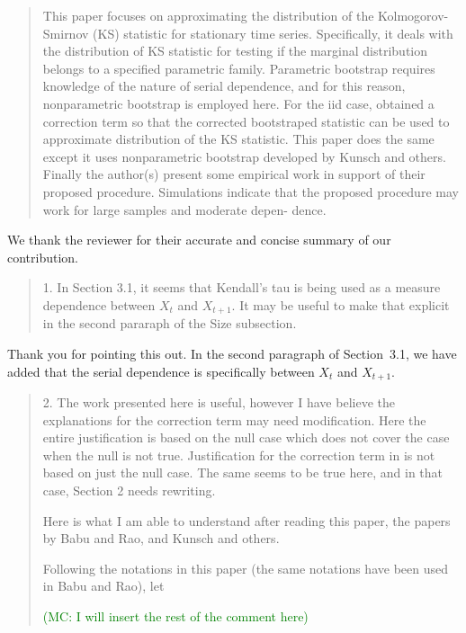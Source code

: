 \documentclass[12pt]{article}
\newcommand{\mc}[1]{\textcolor{green}{(MC: #1)}}
\newenvironment{comment}%
{\begin{quotation}\noindent\small\it\color{darkblue}\ignorespaces%
}{\end{quotation}}
\begin{document}
\begin{comment}
This paper focuses on approximating the distribution of the Kolmogorov-
Smirnov (KS) statistic for stationary time series. Specifically, it deals with the
distribution of KS statistic for testing if the marginal distribution belongs to
a specified parametric family. Parametric bootstrap requires knowledge of the
nature of serial dependence, and for this reason, nonparametric bootstrap is 
employed here. For the iid case, \citet{babu2004goodness} obtained a correction 
term so that the corrected bootstraped statistic can be used to approximate 
distribution of the KS statistic. This paper does the same except it uses 
nonparametric bootstrap developed by Kunsch and others. Finally the author(s) 
present some empirical work in support of their proposed procedure. Simulations 
indicate that the proposed procedure may work for large samples and moderate depen-
dence.
\end{comment}

We thank the reviewer for their accurate and concise summary of our
contribution.

\begin{comment}
1. In Section 3.1, it seems that Kendall's tau is being used as a measure
dependence between $X_t$ and $X_{t+1}$. It may be useful to make that explicit 
in the second pararaph of the Size subsection.
\end{comment}

Thank you for pointing this out. In the second paragraph of
Section~3.1, we have added that the serial dependence is specifically
between $X_t$ and $X_{t+1}$.

\begin{comment}
2. The work presented here is useful, however I have believe the explanations
for the correction term may need modification. Here the entire justification is
based on the null case which does not cover the case when the null is not true.
Justification for the correction term in \citet{babu2004goodness} is not based 
on just the
null case. The same seems to be true here, and in that case, Section 2 needs
rewriting.

Here is what I am able to understand after reading this paper, the papers
by Babu and Rao, and Kunsch and others.

Following the notations in this paper (the same notations have been used in
Babu and Rao), let

\mc{I will insert the rest of the comment here}
\end{comment}
\end{document}
